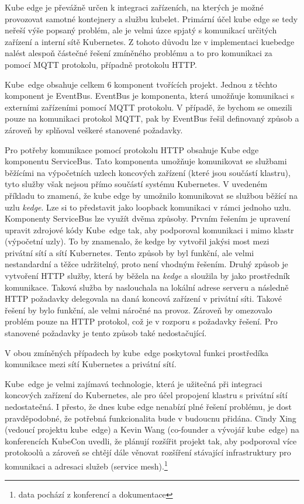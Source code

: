Kube edge je převážně určen k integraci zařízeních, na kterých je možné provozovat samotné kontejnery a službu kubelet. Primární účel kube edge se tedy neřeší výše popsaný problém, ale je velmi úzce spjatý s komunikací určitých zařízení a interní sítě Kubernetes. Z tohoto důvodu lze v implementaci kuebedge nalést alespoň částečné řešení zmíněného problému a to pro komunikaci za pomocí MQTT protokolu, případně protokolu HTTP.

Kube~edge obsahuje celkem 6 komponent tvořících projekt. Jednou z těchto komponent je EventBus. EventBus je komponenta, která umožňuje komunikaci s externími zařízeními pomocí MQTT protokolu. V případě, že bychom se omezili pouze na komunikaci protokol MQTT, pak by EventBus řešil definovaný způsob a zároveň by splňoval veškeré stanovené požadavky.

Pro potřeby komunikace pomocí protokolu HTTP obsahuje Kube edge komponentu ServiceBus. Tato komponenta umožňuje komunikovat se službami běžícími na výpočetních uzlech koncových zařízení (které jsou součástí klastru), tyto služby však nejsou přímo součástí systému Kubernetes. V uvedeném příkladu to znamená, že kube edge by umožnilo komunikovat se službou běžící na uzlu \textit{kedge}. Lze si to představit jako loopback komunikaci v rámci jednoho uzlu. Komponenty ServiceBus lze využít dvěma způsoby. Prvním řešením je upravení upravit zdrojové kódy Kube~edge tak, aby podporoval komunikaci i mimo klastr (výpočetní uzly). To by znamenalo, že kedge by vytvořil jakýsi most mezi privátní sítí a sítí Kubernetes. Tento způsob by byl funkční, ale velmi nestandardní a těžce udržitelný, proto není vhodným řešením. Druhý způsob je vytvoření HTTP služby, která by běžela na \textit{kedge} a sloužila by jako prostředník komunikace. Taková služba by naslouchala na lokální adrese serveru a následně HTTP požadavky delegovala na daná koncová zařízení v privátní síti. Takové řešení by bylo funkční, ale velmi náročné na provoz. Zároveň by omezovalo problém pouze na HTTP protokol, což je v rozporu s požadavky řešení. Pro stanovené požadavky je tento způsob také nedostačující. \cite{ttlv_2021_servicebusgo}

V obou zmíněných případech by kube~edge poskytoval funkci prostředíka komunikace mezi sítí Kubernetes a privátní sítí.

Kube~edge je velmi zajímavá technologie, která je užitečná při integraci koncových zařízení do Kubernetes, ale pro účel propojení klastru s privátní sítí nedostatečná. I přesto, že dnes kube edge nenabízí plné řešení problému, je dost pravděpodobné, že potřebná funkcionalita bude v budoucnu přidána. Cindy Xing (vedoucí projektu kube~edge) a Kevin Wang (co-founder a vývojář kube~edge) na konferencích KubeCon uvedli, že plánují rozšířit projekt tak, aby podporoval více protokoolů a zároveň se chtějí dále věnovat rozšíření stávající infrastruktury pro komunikaci a adresaci služeb (service mesh).\cite{cncfcloudnativecomputingfoundation_2019_intro}\cite{cncfcloudnativecomputingfoundation_2022_intro}\footnote{data pochází z konferencí a dokumentace}

